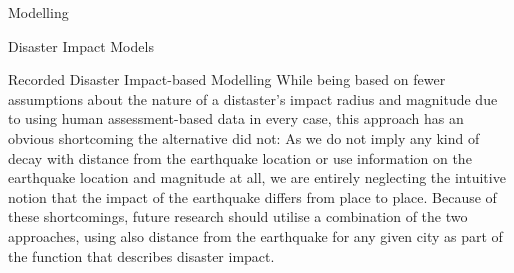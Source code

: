 \documentclass[12pt,fleqn,leqno,letterpaper]{article}
\begin{document}
\begin{section}{Modelling}
\begin{subsection}{Disaster Impact Models}
\begin{subsubsection}{Recorded Disaster Impact-based Modelling}
      While being based on fewer assumptions about the nature of a distaster's impact radius and magnitude due to using human assessment-based data in every case, this approach has an obvious shortcoming the alternative did not: As we do not imply any kind of decay with distance from the earthquake location or use information on the earthquake location and magnitude at all, we are entirely neglecting the intuitive notion that the impact of the earthquake differs from place to place. Because of these shortcomings, future research should utilise a combination of the two approaches, using also distance from the earthquake for any given city as part of the function that describes disaster impact.
    \end{subsubsection}
  \end{subsection}


\end{section}
\end{document}
